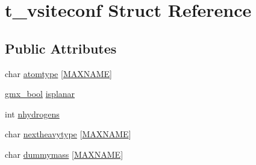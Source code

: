 \hypertarget{structt__vsiteconf}{\section{t\-\_\-vsiteconf \-Struct \-Reference}
\label{structt__vsiteconf}
}
\subsection*{\-Public \-Attributes}
\begin{DoxyCompactItemize}
\item 
char \hyperlink{structt__vsiteconf_a50675b51c512f529b497179fa0625b83}{atomtype} \mbox{[}\hyperlink{gen__vsite_8c_ac881f02a50b29d3ffa5b1f4a0e4f9568}{\-M\-A\-X\-N\-A\-M\-E}\mbox{]}
\item 
\hyperlink{include_2types_2simple_8h_a8fddad319f226e856400d190198d5151}{gmx\-\_\-bool} \hyperlink{structt__vsiteconf_a205e241f42c63c7c3752e8755c42f497}{isplanar}
\item 
int \hyperlink{structt__vsiteconf_a1da5fd96b6a3be475e15fe837d1f6136}{nhydrogens}
\item 
char \hyperlink{structt__vsiteconf_aef232f3b2afa4295f97dae63b2322242}{nextheavytype} \mbox{[}\hyperlink{gen__vsite_8c_ac881f02a50b29d3ffa5b1f4a0e4f9568}{\-M\-A\-X\-N\-A\-M\-E}\mbox{]}
\item 
char \hyperlink{structt__vsiteconf_a1307d900e8871bfdcc6b13d634f2c34b}{dummymass} \mbox{[}\hyperlink{gen__vsite_8c_ac881f02a50b29d3ffa5b1f4a0e4f9568}{\-M\-A\-X\-N\-A\-M\-E}\mbox{]}
\end{DoxyCompactItemize}


